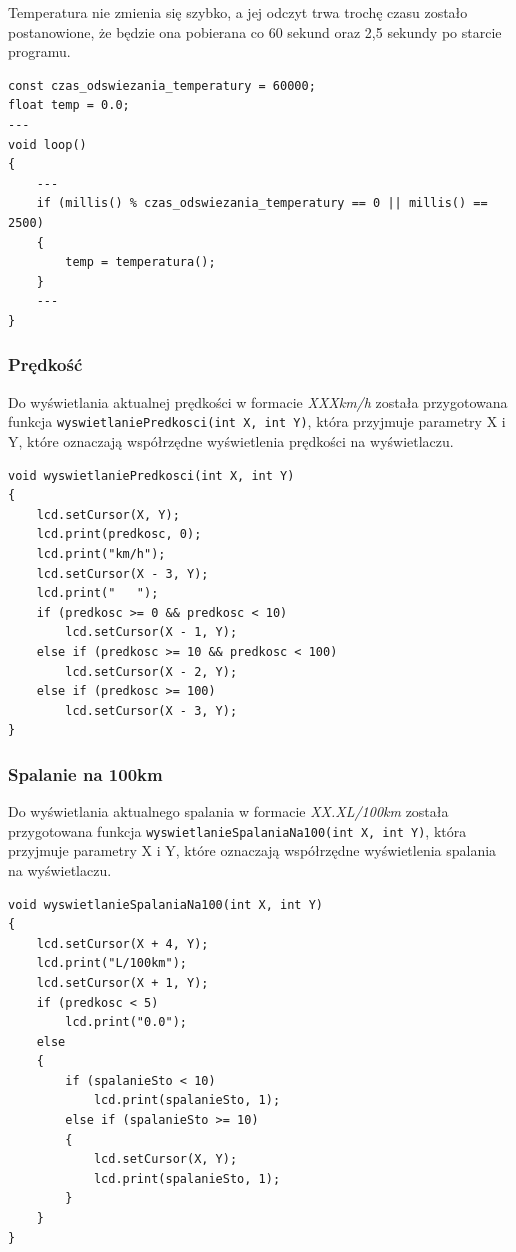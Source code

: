 Temperatura nie zmienia się szybko, a jej odczyt trwa trochę czasu zostało postanowione, że będzie ona pobierana co 60 sekund oraz 2,5 sekundy po starcie programu.
\begin{lstlisting}[label=list:temp_refresh_rate,caption=Implementacja odświeżania temperatury,
basicstyle=\footnotesize\ttfamily]
const czas_odswiezania_temperatury = 60000;
float temp = 0.0;
---
void loop()
{
    ---
    if (millis() % czas_odswiezania_temperatury == 0 || millis() == 2500)
    {
        temp = temperatura();
    }
    ---
}

\end{lstlisting}

\subsubsection{Prędkość}
Do wyświetlania aktualnej prędkości w formacie \textit{XXXkm/h} została przygotowana funkcja \texttt{wyswietlaniePredkosci(int X, int Y)}, która przyjmuje parametry X i Y, które oznaczają współrzędne wyświetlenia prędkości na wyświetlaczu.
\begin{lstlisting}[label=list:show_speed,caption=Wyświetlanie prędkości,
basicstyle=\footnotesize\ttfamily]
void wyswietlaniePredkosci(int X, int Y)
{
    lcd.setCursor(X, Y);
    lcd.print(predkosc, 0);
    lcd.print("km/h");
    lcd.setCursor(X - 3, Y);
    lcd.print("   ");
    if (predkosc >= 0 && predkosc < 10)
    	lcd.setCursor(X - 1, Y);
    else if (predkosc >= 10 && predkosc < 100)
    	lcd.setCursor(X - 2, Y);
    else if (predkosc >= 100)
    	lcd.setCursor(X - 3, Y);
}
\end{lstlisting}
\subsubsection{Spalanie na 100km}
Do wyświetlania aktualnego spalania w formacie \textit{XX.XL/100km} została przygotowana funkcja \texttt{wyswietlanieSpalaniaNa100(int X, int Y)}, która przyjmuje parametry X i Y, które oznaczają współrzędne wyświetlenia spalania na wyświetlaczu.
\begin{lstlisting}[label=list:show_fuel_cons_100,caption=Wyświetlanie spalania na 100km,
basicstyle=\footnotesize\ttfamily]
void wyswietlanieSpalaniaNa100(int X, int Y)
{
    lcd.setCursor(X + 4, Y);
    lcd.print("L/100km");
    lcd.setCursor(X + 1, Y);
    if (predkosc < 5)
    	lcd.print("0.0");
    else
    {
    	if (spalanieSto < 10)
    		lcd.print(spalanieSto, 1);
    	else if (spalanieSto >= 10)
    	{
    		lcd.setCursor(X, Y);
    		lcd.print(spalanieSto, 1);
    	}
    }
}
\end{lstlisting}

